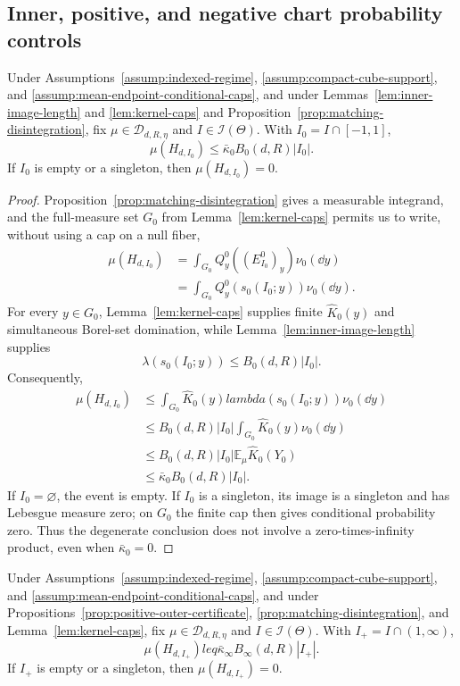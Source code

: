 \subsection{Inner, positive, and negative chart probability controls}
\label{app:chart-probabilities}

\begin{proposition}
\label{prop:inner-chart-probability}
Under Assumptions~\ref{assump:indexed-regime},
\ref{assump:compact-cube-support}, and
\ref{assump:mean-endpoint-conditional-caps}, and under
Lemmas~\ref{lem:inner-image-length} and \ref{lem:kernel-caps} and
Proposition~\ref{prop:matching-disintegration}, fix
$\mu\in\mathcal D_{d,R,\eta}$ and $I\in\mathcal I(\Theta)$.  With
$I_0=I\cap[-1,1]$,
\[
\mu(H_{d,I_0})\leq\bar\kappa_0B_0(d,R)|I_0|.
\]
If $I_0$ is empty or a singleton, then $\mu(H_{d,I_0})=0$.
\end{proposition}

\begin{proof}
Proposition~\ref{prop:matching-disintegration} gives a measurable integrand,
and the full-measure set $G_0$ from Lemma~\ref{lem:kernel-caps} permits us to
write, without using a cap on a null fiber,
\[
\begin{aligned}
\mu(H_{d,I_0})
&=\int_{G_0}Q^0_y((E^0_{I_0})_y)\nu_0(\dd y)\\
&=\int_{G_0}Q^0_y(s_0(I_0;y))\nu_0(\dd y).
\end{aligned}
\]
For every $y\in G_0$, Lemma~\ref{lem:kernel-caps} supplies finite
$\widehat K_0(y)$ and simultaneous Borel-set domination, while
Lemma~\ref{lem:inner-image-length} supplies
\[
\lambda(s_0(I_0;y))\leq B_0(d,R)|I_0|.
\]
Consequently,
\[
\begin{aligned}
\mu(H_{d,I_0})
&\leq\int_{G_0}\widehat K_0(y)lambda(s_0(I_0;y))\nu_0(\dd y)\\
&\leq B_0(d,R)|I_0|\int_{G_0}\widehat K_0(y)\nu_0(\dd y)\\
&\leq B_0(d,R)|I_0|\mathbb E_\mu\widehat K_0(Y_0)\\
&\leq\bar\kappa_0B_0(d,R)|I_0|.
\end{aligned}
\]
If $I_0=\varnothing$, the event is empty.  If $I_0$ is a singleton, its
image is a singleton and has Lebesgue measure zero; on $G_0$ the finite cap
then gives conditional probability zero.  Thus the degenerate conclusion
does not involve a zero-times-infinity product, even when
$\bar\kappa_0=0$.
\end{proof}

\begin{proposition}
\label{prop:positive-chart-probability}
Under Assumptions~\ref{assump:indexed-regime},
\ref{assump:compact-cube-support}, and
\ref{assump:mean-endpoint-conditional-caps}, and under
Propositions~\ref{prop:positive-outer-certificate},
\ref{prop:matching-disintegration}, and Lemma~\ref{lem:kernel-caps}, fix
$\mu\in\mathcal D_{d,R,\eta}$ and $I\in\mathcal I(\Theta)$.  With
$I_+=I\cap(1,\infty)$,
\[
\mu(H_{d,I_+})leq\bar\kappa_\infty B_\infty(d,R)|I_+|.
\]
If $I_+$ is empty or a singleton, then $\mu(H_{d,I_+})=0$.
\end{proposition}

